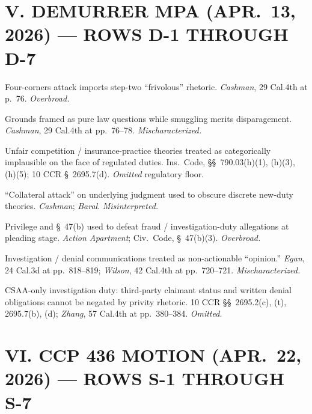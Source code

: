 \section*{V. DEMURRER MPA (APR.\ 13, 2026) --- ROWS D-1 THROUGH D-7}

\begin{description}
\tightlist
\item[D-1.] Four-corners attack imports step-two ``frivolous'' rhetoric. \textit{Cashman}, 29 Cal.4th at p.\ 76. \textit{Overbroad.}
\item[D-2.] Grounds framed as pure law questions while smuggling merits disparagement. \textit{Cashman}, 29 Cal.4th at pp.\ 76--78. \textit{Mischaracterized.}
\item[D-3.] Unfair competition / insurance-practice theories treated as categorically implausible on the face of regulated duties. Ins.\ Code, \S\S~790.03(h)(1), (h)(3), (h)(5); 10 CCR \S~2695.7(d). \textit{Omitted} regulatory floor.
\item[D-4.] ``Collateral attack'' on underlying judgment used to obscure discrete new-duty theories. \textit{Cashman}; \textit{Baral}. \textit{Misinterpreted.}
\item[D-5.] Privilege and \S~47(b) used to defeat fraud / investigation-duty allegations at pleading stage. \textit{Action Apartment}; Civ.\ Code, \S~47(b)(3). \textit{Overbroad.}
\item[D-6.] Investigation / denial communications treated as non-actionable ``opinion.'' \textit{Egan}, 24 Cal.3d at pp.\ 818--819; \textit{Wilson}, 42 Cal.4th at pp.\ 720--721. \textit{Mischaracterized.}
\item[D-7.] CSAA-only investigation duty: third-party claimant status and written denial obligations cannot be negated by privity rhetoric. 10 CCR \S\S~2695.2(c), (t), 2695.7(b), (d); \textit{Zhang}, 57 Cal.4th at pp.\ 380--384. \textit{Omitted.}
\end{description}

\section*{VI. CCP 436 MOTION (APR.\ 22, 2026) --- ROWS S-1 THROUGH S-7}

